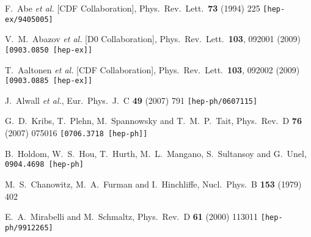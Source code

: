 \documentclass[12pt,a4paper]{article}
\begin{document}
\begin{thebibliography}{99}


  F.~Abe {\it et al.}  [CDF Collaboration],
  Phys.\ Rev.\ Lett.\  {\bf 73} (1994) 225
  {\tt [hep-ex/9405005]}

  V.~M.~Abazov {\it et al.}  [D0 Collaboration],
  Phys.\ Rev.\ Lett.\  {\bf 103}, 092001 (2009)
  {\tt [0903.0850 [hep-ex]]}

  T.~Aaltonen {\it et al.}  [CDF Collaboration],
  Phys.\ Rev.\ Lett.\  {\bf 103}, 092002 (2009)
  {\tt [0903.0885 [hep-ex]]}

  J.~Alwall {\it et al.},
  Eur.\ Phys.\ J.\  C {\bf 49} (2007) 791
  {\tt [hep-ph/0607115]}

  G.~D.~Kribs, T.~Plehn, M.~Spannowsky and T.~M.~P.~Tait,
  Phys.\ Rev.\  D {\bf 76} (2007) 075016
  {\tt [0706.3718 [hep-ph]]}

  B.~Holdom, W.~S.~Hou, T.~Hurth, M.~L.~Mangano, S.~Sultansoy and G.~Unel,
  {\tt 0904.4698 [hep-ph]}

  M.~S.~Chanowitz, M.~A.~Furman and I.~Hinchliffe,
  Nucl.\ Phys.\  B {\bf 153} (1979) 402


  E.~A.~Mirabelli and M.~Schmaltz,
  Phys.\ Rev.\  D {\bf 61} (2000) 113011
  {\tt [hep-ph/9912265]}


\end{thebibliography}
\end{document}
